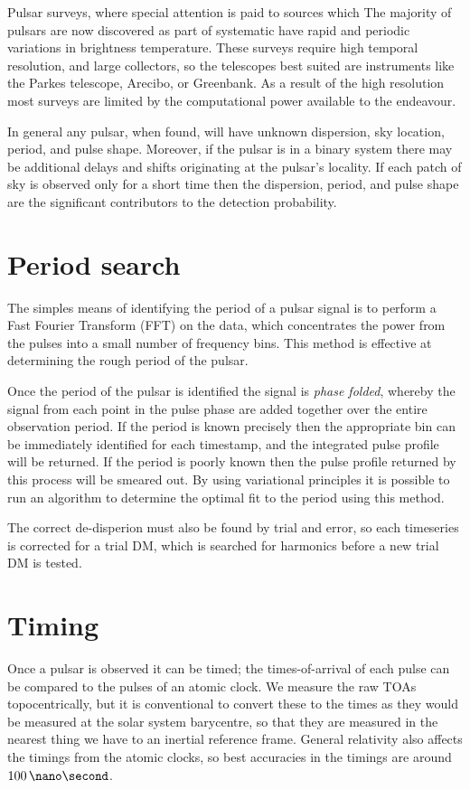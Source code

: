 Pulsar surveys, where special attention is paid to sources which The
majority of pulsars are now discovered as part of systematic have
rapid and periodic variations in brightness temperature. These surveys
require high temporal resolution, and large collectors, so the
telescopes best suited are instruments like the Parkes telescope,
Arecibo, or Greenbank. As a result of the high resolution most surveys
are limited by the computational power available to the endeavour.

In general any pulsar, when found, will have unknown dispersion, sky
location, period, and pulse shape. Moreover, if the pulsar is in a
binary system there may be additional delays and shifts originating at
the pulsar's locality. If each patch of sky is observed only for a
short time then the dispersion, period, and pulse shape are the
significant contributors to the detection probability.

\section{Period search}
\label{sec:period-search}

The simples means of identifying the period of a pulsar signal is to
perform a Fast Fourier Transform (FFT) on the data, which concentrates
the power from the pulses into a small number of frequency bins. This
method is effective at determining the rough period of the pulsar. 

Once the period of the pulsar is identified the signal is \emph{phase
  folded}, whereby the signal from each point in the pulse phase are
added together over the entire observation period. If the period is
known precisely then the appropriate bin can be immediately identified
for each timestamp, and the integrated pulse profile will be
returned. If the period is poorly known then the pulse profile
returned by this process will be smeared out. By using variational
principles it is possible to run an algorithm to determine the optimal
fit to the period using this method.

The correct de-disperion must also be found by trial and error, so
each timeseries is corrected for a trial DM, which is searched for
harmonics before a new trial DM is tested.

\section{Timing}
\label{sec:timing}

Once a pulsar is observed it can be timed; the times-of-arrival of
each pulse can be compared to the pulses of an atomic clock. We
measure the raw TOAs topocentrically, but it is conventional to
convert these to the times as they would be measured at the solar
system barycentre, so that they are measured in the nearest thing we
have to an inertial reference frame. General relativity also affects
the timings from the atomic clocks, so best accuracies in the timings
are around $100\,\nano\second$.

